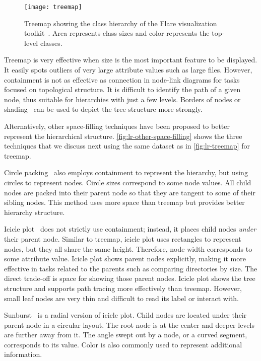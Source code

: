 \begin{figure}[!htb]
	\centering
	\texttt{[image: treemap]}
	\caption{Treemap showing the class hierarchy of the Flare visualization toolkit~\cite{Heer2009b}. Area represents class sizes and color represents the top-level classes.}
	\label{fig:lr-treemap}
\end{figure}

Treemap is very effective when size is the most important feature to be displayed. It easily spots outliers of very large attribute values such as large files. However, containment is not as effective as connection in node-link diagrams for tasks focused on topological structure. It is difficult to identify the path of a given node, thus suitable for hierarchies with just a few levels. Borders of nodes or shading~\cite{Wijk1999} can be used to depict the tree structure more strongly.

Alternatively, other space-filling techniques have been proposed to better represent the hierarchical structure. \autoref{fig:lr-other-space-filling} shows the three techniques that we discuss next using the same dataset as in \autoref{fig:lr-treemap} for treemap. 

Circle packing~\cite{Wang2006} also employs containment to represent the hierarchy, but using circles to represent nodes. Circle sizes correspond to some node values. All child nodes are packed into their parent node so that they are tangent to some of their sibling nodes. This method uses more space than treemap but provides better hierarchy structure.

Icicle plot~\cite{Kruskal1983} does not strictly use containment; instead, it places child nodes \emph{under} their parent node. Similar to treemap, icicle plot uses rectangles to represent nodes, but they all share the same height. Therefore, node width corresponds to some attribute value. Icicle plot shows parent nodes explicitly, making it more effective in tasks related to the parents such as comparing directories by size. The direct trade-off is space for showing those parent nodes. Icicle plot shows the tree structure and supports path tracing more effectively than treemap. However, small leaf nodes are very thin and difficult to read its label or interact with.

Sunburst~\cite{Zhang2000} is a radial version of icicle plot. Child nodes are located under their parent node in a circular layout. The root node is at the center and deeper levels are further away from it. The angle swept out by a node, or a curved segment, corresponds to its value. Color is also commonly used to represent additional information.


